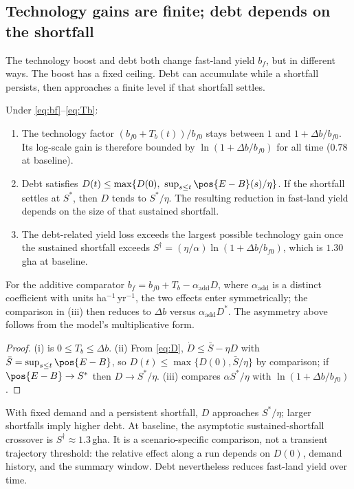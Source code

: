 \subsection{Technology gains are finite; debt depends on the shortfall}\label{sec:bounded}

The technology boost and debt both change fast-land yield $b_f$, but in different ways. The boost has a fixed ceiling. Debt can accumulate while a shortfall persists, then approaches a finite level if that shortfall settles.

\begin{proposition}\label{prop:bounded}
Under \eqref{eq:bf}--\eqref{eq:Tb}:
\begin{enumerate}[label=(\roman*)]
\item The technology factor $(b_{f0}+T_b(t))/b_{f0}$ stays between $1$ and $1+\Delta b/b_{f0}$. Its log-scale gain is therefore bounded by $\ln(1+\Delta b/b_{f0})$ for all time ($0.78$ at baseline).
\item Debt satisfies $D(t)\le\max\{D(0),\ \sup_{s\le t}\pos{E-B}(s)/\eta\}$. If the shortfall settles at $S^*$, then $D$ tends to $S^*/\eta$. The resulting reduction in fast-land yield depends on the size of that sustained shortfall.
\item The debt-related yield loss exceeds the largest possible technology gain once the sustained shortfall exceeds $S^\dagger=(\eta/\alpha)\ln(1+\Delta b/b_{f0})$, which is $1.30$\,gha at baseline.
\end{enumerate}
For the additive comparator $b_f=b_{f0}+T_b-\alpha_{\mathrm{add}}D$, where $\alpha_{\mathrm{add}}$ is a distinct coefficient with units ha$^{-1}$\,yr$^{-1}$, the two effects enter symmetrically; the comparison in (iii) then reduces to $\Delta b$ versus $\alpha_{\mathrm{add}}D^*$. The asymmetry above follows from the model's multiplicative form.
\end{proposition}

\begin{proof}
(i) is $0\le T_b\le\Delta b$. (ii) From \eqref{eq:D}, $\dot D\le\bar S-\eta D$ with $\bar S=\sup_{s\le t}\pos{E-B}$, so $D(t)\le\max\{D(0),\bar S/\eta\}$ by comparison; if $\pos{E-B}\to S^*$ then $D\to S^*/\eta$. (iii) compares $\alpha S^*/\eta$ with $\ln(1+\Delta b/b_{f0})$.
\end{proof}

With fixed demand and a persistent shortfall, $D$ approaches $S^*/\eta$; larger shortfalls imply higher debt. At baseline, the asymptotic sustained-shortfall crossover is $S^\dagger\approx1.3$\,gha. It is a scenario-specific comparison, not a transient trajectory threshold: the relative effect along a run depends on $D(0)$, demand history, and the summary window. Debt nevertheless reduces fast-land yield over time.


